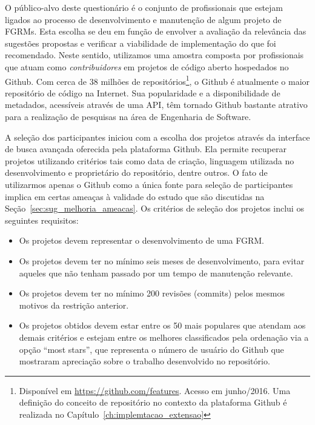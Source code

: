 O público-alvo deste questionário é o conjunto de profissionais que estejam
ligados ao processo de desenvolvimento e manutenção de algum projeto de FGRMs.
Esta escolha se deu em função de envolver a avaliação da relevância das
sugestões propostas e verificar a viabilidade de implementação do que foi
recomendado. Neste sentido, utilizamos uma amostra composta por profissionais
que atuam como \textit{contribuidores} em projetos de código aberto hospedados
no Github. Com cerca de 38 milhões de repositórios\footnote{Disponível em
    \url{https://github.com/features}. Acesso em junho/2016. Uma definição do
    conceito de repositório no contexto da plataforma Github é realizada no
    Capítulo~\ref{ch:implemtacao_extensao}}, o Github é atualmente o maior
repositório de código na Internet. Sua popularidade e a disponibilidade de
metadados, acessíveis através de uma API, têm tornado Github bastante atrativo
para a realização de pesquisas na área de Engenharia de Software.

A seleção dos participantes iniciou com a escolha dos projetos através da
interface de busca avançada oferecida pela plataforma Github. Ela permite
recuperar projetos utilizando critérios tais como data de criação, linguagem
utilizada no desenvolvimento e proprietário do repositório, dentre outros. O
fato de utilizarmos apenas o Github como a única fonte para seleção de
participantes implica em certas ameaças à validade do estudo que são discutidas
na Seção~\ref{sec:sug_melhoria_ameacas}. Os critérios de seleção dos projetos
inclui os seguintes requisitos:

\begin{itemize}
	\item Os projetos devem representar o desenvolvimento de uma FGRM\@.
    \item Os projetos devem ter no mínimo seis meses de desenvolvimento, para
        evitar aqueles que não tenham passado por um tempo de manutenção
        relevante.
	\item Os projetos devem  ter  no  mínimo  200  revisões (commits)  pelos
		mesmos motivos  da restrição anterior.
    \item Os projetos obtidos devem estar entre os 50 mais populares que
        atendam aos demais critérios e estejam entre os melhores classificados
        pela ordenação via a opção ``most stars'', que representa o número de
        usuário do Github que mostraram apreciação sobre o trabalho
        desenvolvido no repositório.
\end{itemize}

